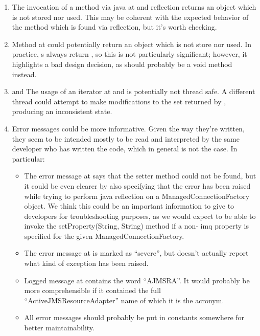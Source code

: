 \begin{enumerate}
	\item {} The invocation of a method via java at  and  reflection returns an  object which is not stored nor used. This may be coherent with the expected behavior of the  method which is found via reflection, but it's worth checking. 
	\item {} Method  at  could potentially return an  object which is not store nor used. In practice, s always return , so this is not particularly significant; however, it highlights a bad design decision, as  should probably be a void method instead. 
	\item {} and  The usage of an iterator at  and  is potentially not thread safe. A different thread could attempt to make modifications to the set returned by , producing an inconsistent state. 
	\item {} Error messages could be more informative. Given the way they're written, they seem to be intended mostly to be read and interpreted by the same developer who has written the code, which in general is not the case. In particular:
		\begin{itemize}
			\item The error message at  says that the setter method could not be found, but it could be even clearer by also specifying that the error has been raised while trying to perform java reflection on a ManagedConnectionFactory object. We think this could be an important information to give to developers for troubleshooting purposes, as we would expect to be able to invoke the setProperty(String, String) method if a non- imq property is specified for the given ManagedConnectionFactory. 
			\item The error message at  is marked as “severe”, but doesn't actually report what kind of exception has been raised. 
			\item Logged message at  contains the word “AJMSRA”. It would probably be more comprehensible if it contained the full “ActiveJMSResourceAdapter” name of which it is the acronym. 
			\item All error messages should probably be put in constants somewhere for better maintainability. 

\end{itemize}
\end{enumerate}
